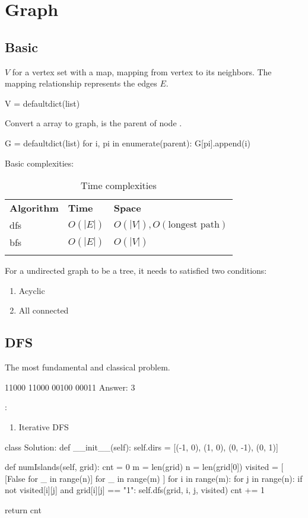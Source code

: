 \chapter{Graph}

\section{Basic}
 $V$ for a vertex set with a map, mapping from vertex to its neighbors. The mapping relationship represents the edges $E$.
\begin{python}
V = defaultdict(list)
\end{python}

Convert a  array to graph,  is the parent of node . 
\begin{python}
G = defaultdict(list)
for i, pi in enumerate(parent):
    G[pi].append(i)
\end{python}
 Basic complexities:

\begin{table}

\begin{tabular}{lll}
\hline\noalign{\smallskip}
\textbf{Algorithm} & \textbf{Time}  & \textbf{Space}\\
\noalign{\smallskip}\hline\noalign{\smallskip}
dfs & $O(|E|)$ & $O(|V|), O(\text{longest path})$ \\
bfs & $O(|E|)$ & $O(|V|)$ \\
\noalign{\smallskip}\hline\noalign{\smallskip}
\end{tabular}

\caption{Time complexities}
\end{table}

 For a undirected graph to be a tree, it needs to satisfied two conditions:
\begin{enumerate}
\item Acyclic
\item All connected
\end{enumerate}
\section{DFS}
 The most fundamental and classical problem.
\begin{python}
11000
11000
00100
00011
Answer: 3
\end{python}
:
\begin{enumerate}
\item Iterative DFS
\end{enumerate}
\begin{python}
class Solution:
  def __init__(self):
    self.dirs = [(-1, 0), (1, 0), (0, -1), (0, 1)]

  def numIslands(self, grid):
    cnt = 0
    m = len(grid)
    n = len(grid[0])
    visited = [
      [False for _ in range(n)]
      for _ in range(m)
    ]
    for i in range(m):
      for j in range(n):
        if not visited[i][j] and grid[i][j] == "1":
          self.dfs(grid, i, j, visited)
          cnt += 1

    return cnt
\end{python}

